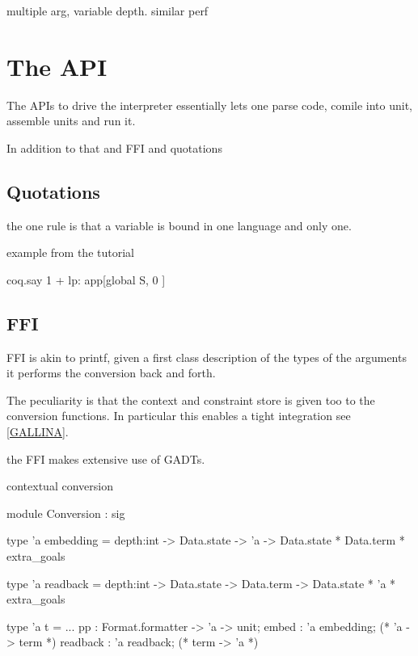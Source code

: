 \documentclass[a4paper, 11pt]{book}
\begin{document}
multiple arg, variable depth. similar perf


\section{The API}

The APIs to drive the interpreter essentially lets one parse code, comile into
unit, assemble units and run it.

In addition to that and FFI and quotations

\subsection{Quotations}

the one rule is that a variable is bound in one language and only
one.

example from the tutorial

\begin{elpicode}
  coq.say {{ 1 + lp:{{ app[global S, {{ 0 }} ]  }}   }}
\end{elpicode}


\subsection{FFI}\label{FFI}

FFI is akin to printf, given a first class description of
the types of the arguments it performs the conversion
back and forth.

The peculiarity is that the context and constraint store
is given too to the conversion functions. In particular
this enables a tight integration see \ref{GALLINA}.

the FFI makes extensive use of GADTs.

contextual conversion

\begin{ocamlcode}
module Conversion : sig

type 'a embedding =
  depth:int ->
  Data.state -> 'a -> Data.state * Data.term * extra_goals

type 'a readback =
  depth:int ->
  Data.state -> Data.term -> Data.state * 'a * extra_goals

type 'a t = {
  ...
  pp : Format.formatter -> 'a -> unit;
  embed : 'a embedding;   (* 'a -> term *)
  readback : 'a readback; (* term -> 'a *)
}
\end{ocamlcode}
\end{document}
